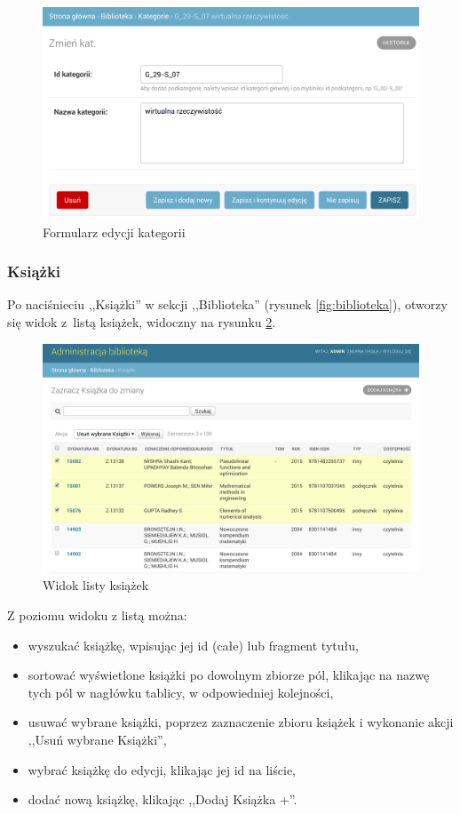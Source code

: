 \documentclass[twoside]{projektInzynierskiMS}
\begin{document}
\begin{figure}[h]
  \centering
  \includegraphics[width=0.6\linewidth]{img/backend/EdycjaKategorii.png}
  \caption{Formularz edycji kategorii}
  \label{fig:adminEditCategory}
\end{figure}

\subsubsection{Książki}

Po naciśnieciu ,,Książki'' w sekcji ,,Biblioteka'' (rysunek \ref{fig:biblioteka}), otworzy się widok z~listą książek, widoczny na rysunku \ref{fig:adminBooks}. 

\begin{figure}[h]
  \centering
  \includegraphics[width=0.6\linewidth]{img/backend/ListaKsiazek.png}
  \caption{Widok listy książek}
  \label{fig:adminBooks}
\end{figure}

Z poziomu widoku z listą można:
\begin{itemize}
	\item wyszukać książkę, wpisując jej id (całe) lub fragment tytułu,
	\item sortować wyświetlone książki po dowolnym zbiorze pól, klikając na nazwę tych pól w nagłówku tablicy, w odpowiedniej kolejności,
	\item usuwać wybrane książki, poprzez zaznaczenie zbioru książek i wykonanie akcji ,,Usuń wybrane Książki'',
	\item wybrać książkę do edycji, klikając jej id na liście,
	\item dodać nową książkę, klikając ,,Dodaj Książka +''.
\end{itemize}
\end{document}

